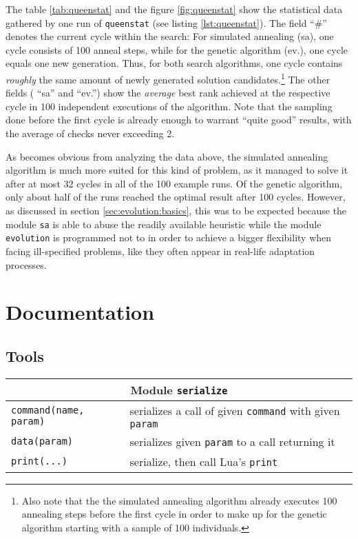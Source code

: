 \begin{appendices}
The table \ref{tab:queenstat} and the figure \ref{fig:queenstat} show the statistical data gathered by one run of \texttt{queenstat} (see listing \ref{lst:queenstat}). The field ``\#'' denotes the current cycle within the search: For simulated annealing (sa), one cycle consists of 100 anneal steps, while for the genetic algorithm (ev.), one cycle equals one new generation. Thus, for both search algorithms, one cycle contains \emph{roughly} the same amount of newly generated solution candidates.\footnote{Also note that the the simulated annealing algorithm already executes 100 annealing steps before the first cycle in order to make up for the genetic algorithm starting with a sample of 100 individuals.} The other fields ( ``sa'' and ``ev.'') show the \emph{average} best rank achieved at the respective cycle in 100 independent executions of the algorithm. Note that the sampling done before the first cycle is already enough to warrant ``quite good'' results, with the average of checks never exceeding 2.

As becomes obvious from analyzing the data above, the simulated annealing algorithm is much more suited for this kind of problem, as it managed to solve it after at most 32 cycles in all of the 100 example runs. Of the genetic algorithm, only about half of the runs reached the optimal result after 100 cycles. However, as discussed in section \ref{sec:evolution:basics}, this was to be expected because the module \texttt{sa} is able to abuse the readily available heuristic while the module \texttt{evolution} is programmed not to in order to achieve a bigger flexibility when facing ill-specified problems, like they often appear in real-life adaptation processes.

\chapter{Documentation}

\section{Tools}

\begin{table}[H]
\begin{tabular}{|p{5cm}|p{8cm}|}
\hline
\multicolumn{2}{|c|}{Module \texttt{serialize}}\\
\hline
\hline
\texttt{command(name, param)} & serializes a call of given \texttt{command} with given \texttt{param}\\
\hline
\texttt{data(param)} & serializes given \texttt{param} to a call returning it\\
\hline
\texttt{print(...)} & serialize, then call Lua's \texttt{print}\\
\hline
\end{tabular}
\end{table}


\end{appendices}

